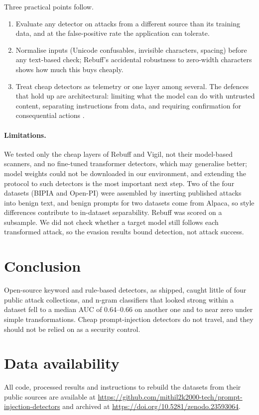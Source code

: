 \documentclass[preprint,12pt,authoryear]{elsarticle}
\begin{document}
Three practical points follow.
\begin{enumerate}
\item Evaluate any detector on attacks from a different source than its training data, and at the false-positive rate the
application can tolerate.
\item Normalise inputs (Unicode confusables, invisible characters, spacing) before any text-based check; Rebuff's accidental
robustness to zero-width characters shows how much this buys cheaply.
\item Treat cheap detectors as telemetry or one layer among several. The defences that hold up are architectural: limiting what
the model can do with untrusted content, separating instructions from data, and requiring confirmation for consequential
actions \citep{greshake2023indirect,liu2024formalizing,hines2024spotlighting,chen2025struq}.
\end{enumerate}

\paragraph{Limitations.} We tested only the cheap layers of Rebuff and Vigil, not their model-based scanners, and no fine-tuned
transformer detectors, which may generalise better; model weights could not be downloaded in our environment, and extending the
protocol to such detectors is the most important next step. Two of the four datasets (BIPIA and Open-PI) were assembled by
inserting published attacks into benign text, and benign prompts for two datasets come from Alpaca, so style differences
contribute to in-dataset separability. Rebuff was scored on a subsample. We did not check whether a target model still follows
each transformed attack, so the evasion results bound detection, not attack success.

\section{Conclusion}
Open-source keyword and rule-based detectors, as shipped, caught little of four public attack collections, and n-gram
classifiers that looked strong within a dataset fell to a median AUC of 0.64--0.66 on another one and to near zero under simple
transformations. Cheap prompt-injection detectors do not travel, and they should not be relied on as a security control.

\section*{Data availability}
All code, processed results and instructions to rebuild the datasets from their public sources are available at
\url{https://github.com/mithil2k2000-tech/prompt-injection-detectors} and archived at
\url{https://doi.org/10.5281/zenodo.23593064}.
\end{document}
